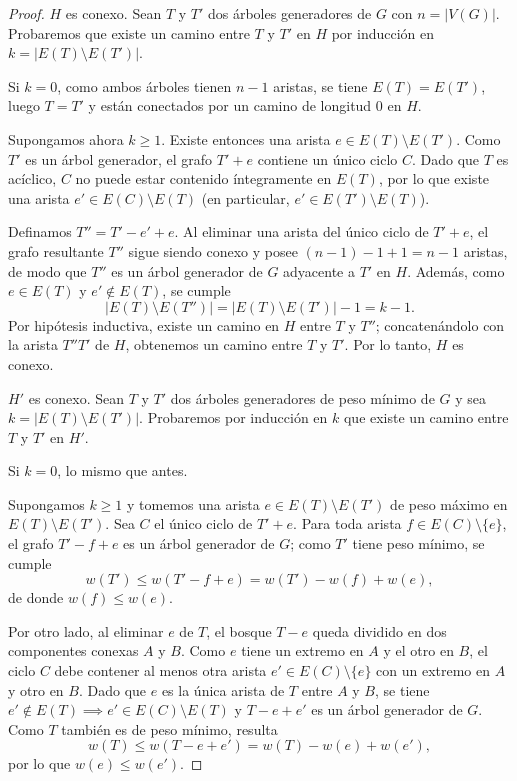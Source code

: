 \begin{proof}
    \( H \) es conexo. Sean \( T \) y \( T' \) dos árboles generadores de \( G \) con \( n = |V(G)| \). Probaremos que existe un camino entre \( T \) y \( T' \) en \( H \) por inducción en \( k = |E(T) \setminus E(T')| \).

    Si \( k = 0 \), como ambos árboles tienen \( n - 1 \) aristas, se tiene \( E(T) = E(T') \), luego \( T = T' \) y están conectados por un camino de longitud \( 0 \) en \( H \).

    Supongamos ahora \( k \geq 1 \). Existe entonces una arista \( e \in E(T) \setminus E(T') \). Como \( T' \) es un árbol generador, el grafo \( T' + e \) contiene un único ciclo \( C \). Dado que \( T \) es acíclico, \( C \) no puede estar contenido íntegramente en \( E(T) \), por lo que existe una arista \( e' \in E(C) \setminus E(T) \) (en particular, \( e' \in E(T') \setminus E(T) \)).

    Definamos \( T'' = T' - e' + e \). Al eliminar una arista del único ciclo de \( T' + e \), el grafo resultante \( T'' \) sigue siendo conexo y posee \( (n - 1) - 1 + 1 = n - 1 \) aristas, de modo que \( T'' \) es un árbol generador de \( G \) adyacente a \( T' \) en \( H \). Además, como \( e \in E(T) \) y \( e' \notin E(T) \), se cumple
    \[
        |E(T) \setminus E(T'')| = |E(T) \setminus E(T')| - 1 = k - 1.
    \]
    Por hipótesis inductiva, existe un camino en \( H \) entre \( T \) y \( T'' \); concatenándolo con la arista \( T''T' \) de \( H \), obtenemos un camino entre \( T \) y \( T' \). Por lo tanto, \( H \) es conexo.

    \( H' \) es conexo. Sean \( T \) y \( T' \) dos árboles generadores de peso mínimo de \( G \) y sea \( k = |E(T) \setminus E(T')| \). Probaremos por inducción en \( k \) que existe un camino entre \( T \) y \( T' \) en \( H' \).

    Si \( k = 0 \), lo mismo que antes.

    Supongamos \( k \geq 1 \) y tomemos una arista \( e \in E(T) \setminus E(T') \) de peso máximo en \( E(T) \setminus E(T') \). Sea \( C \) el único ciclo de \( T' + e \). Para toda arista \( f \in E(C) \setminus \{e\} \), el grafo \( T' - f + e \) es un árbol generador de \( G \); como \( T' \) tiene peso mínimo, se cumple
    \[
        w(T') \leq w(T' - f + e) = w(T') - w(f) + w(e),
    \]
    de donde \( w(f) \leq w(e) \).

    Por otro lado, al eliminar \( e \) de \( T \), el bosque \( T - e \) queda dividido en dos componentes conexas \( A \) y \( B \). Como \( e \) tiene un extremo en \( A \) y el otro en \( B \), el ciclo \( C \) debe contener al menos otra arista \( e' \in E(C) \setminus \{e\} \) con un extremo en \( A \) y otro en \( B \). Dado que \( e \) es la única arista de \( T \) entre \( A \) y \( B \), se tiene \( e' \notin E(T) \implies e' \in E(C) \setminus E(T) \) y \( T - e + e' \) es un árbol generador de \( G \). Como \( T \) también es de peso mínimo, resulta
    \[
        w(T) \leq w(T - e + e') = w(T) - w(e) + w(e'),
    \]
    por lo que \( w(e) \leq w(e') \).


\end{proof}
